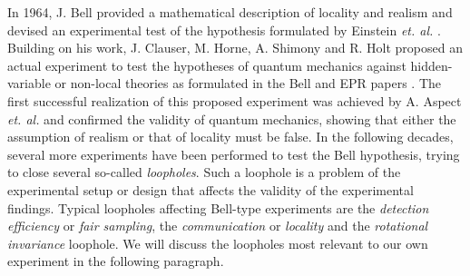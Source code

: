 \smallskip

In 1964, J. Bell provided a mathematical description of locality and realism and devised an experimental test of the hypothesis formulated by Einstein {\it et. al.} \citep{bell_einstein_1964}. Building on his work, J. Clauser, M. Horne, A. Shimony and R. Holt proposed an actual experiment to test the hypotheses of quantum mechanics against hidden-variable or non-local theories as formulated in the Bell and EPR papers \cite{clauser_proposed_1969}. The first successful realization of this proposed experiment was achieved by A. Aspect {\it et. al.} \cite{aspect_experimental_1982} and confirmed the validity of quantum mechanics, showing that either the assumption of realism or that of locality must be false. In the following decades, several more experiments have been performed to test the Bell hypothesis, trying to close several so-called {\it loopholes}. Such a loophole is a problem of the experimental setup or design that affects the validity of the experimental findings. Typical loopholes affecting Bell-type experiments are the {\it detection efficiency} or {\it fair sampling}, the {\it communication} or {\it locality} and the {\it rotational invariance} loophole. We will discuss the loopholes most relevant to our own experiment in the following paragraph.

\smallskip

